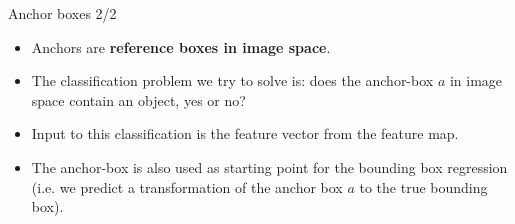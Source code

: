 \documentclass[xcolor=pdftex,dvipsnames,table]{beamer}
\begin{document}
\begin{frame}{Anchor boxes 2/2}
\begin{itemize}
  \item Anchors are \textbf{reference boxes in image space}. 
  \item The classification problem we try to solve is: does the anchor-box $a$ in image space contain an object, yes or no? 
  \item Input to this classification is the feature vector from the feature map. 
  \item The anchor-box is also used as starting point for the bounding box regression (i.e. we predict a transformation of the anchor box $a$ to the true bounding box). 
\end{itemize}
\end{frame}


\end{document}
